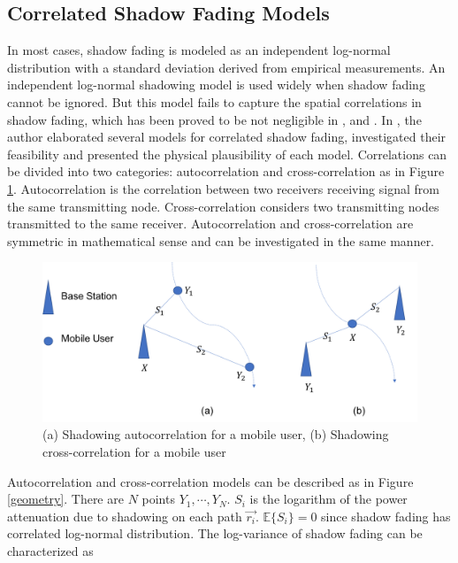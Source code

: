 \subsection{Correlated Shadow Fading Models}
\par In most cases, shadow fading is modeled as an independent log-normal distribution \cite{goldsmith2005wireless} with a standard deviation derived from empirical measurements. An independent log-normal shadowing model is used widely when shadow fading cannot be ignored. But this model fails to capture the spatial correlations in shadow fading, which has been proved to be not negligible in \cite{graziano1978propagation}, \cite{marsan1990shadowing} and \cite{liberti1992statistics}. In \cite{szyszkowicz2010feasibility}, the author elaborated several models for correlated shadow fading,  investigated their feasibility and presented the physical plausibility of each model. Correlations can be divided into two categories: autocorrelation and cross-correlation as in Figure \ref{correlation}. Autocorrelation is the correlation between two receivers receiving signal from the same transmitting node. Cross-correlation considers two transmitting nodes transmitted to the same receiver. Autocorrelation and cross-correlation are symmetric in mathematical sense and can be investigated in the same manner.
\begin{figure} 
\centering
\includegraphics[width=14cm]{correlation.png}
\caption{(a) Shadowing autocorrelation for a mobile user, (b) Shadowing cross-correlation for a mobile user}
\label{correlation}
\end{figure}
\par Autocorrelation and cross-correlation models can be described as in Figure \ref{geometry}. There are $N$ points $Y_{1}, \cdots, Y_{N}$.  $S_{i}$ is the logarithm of the power attenuation due to shadowing on each path $\vec{r_{i}}$. $\mathbb{E}\{S_{i}\} = 0$ since shadow fading has correlated log-normal distribution. The log-variance of shadow fading can be characterized as 
